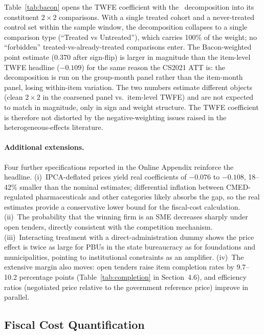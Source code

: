 


Table~\ref{tab:bacon} opens the TWFE coefficient with the~\citet{goodmanbacon2021} decomposition into its constituent $2{\times}2$ comparisons. With a single treated cohort and a never-treated control set within the sample window, the decomposition collapses to a single comparison type (``Treated vs Untreated''), which carries 100\% of the weight; no ``forbidden'' treated-vs-already-treated comparisons enter. The Bacon-weighted point estimate ($0.370$ after sign-flip) is larger in magnitude than the item-level TWFE headline ($-0.109$) for the same reason the CS2021 ATT is: the decomposition is run on the group-month panel rather than the item-month panel, losing within-item variation. The two numbers estimate different objects (clean $2{\times}2$ in the coarsened panel vs.\ item-level TWFE) and are not expected to match in magnitude, only in sign and weight structure. The TWFE coefficient is therefore not distorted by the negative-weighting issues raised in the heterogeneous-effects literature.



\paragraph{Additional extensions.}
Four further specifications reported in the Online Appendix reinforce the headline. (i)~IPCA-deflated prices yield real coefficients of $-0.076$ to $-0.108$, 18--42\% smaller than the nominal estimates; differential inflation between CMED-regulated pharmaceuticals and other categories likely absorbs the gap, so the real estimates provide a conservative lower bound for the fiscal-cost calculation. (ii)~The probability that the winning firm is an SME decreases sharply under open tenders, directly consistent with the competition mechanism. (iii)~Interacting treatment with a direct-administration dummy shows the price effect is twice as large for PBUs in the state bureaucracy as for foundations and municipalities, pointing to institutional constraints as an amplifier. (iv)~The extensive margin also moves: open tenders raise item completion rates by 9.7--10.2 percentage points (Table~\ref{tab:completion} in Section~4.6), and efficiency ratios (negotiated price relative to the government reference price) improve in parallel.

\subsection{Fiscal Cost Quantification}

